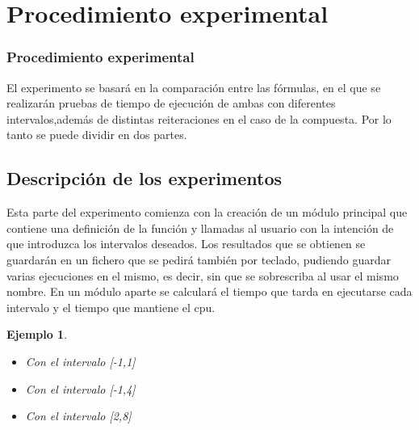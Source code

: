 \documentclass{beamer}
\newtheorem{ejemplo}{Ejemplo}
\begin{document}
\section{Procedimiento experimental}

\begin{frame}
\frametitle{Procedimiento experimental}
\begin{block}{}
El experimento se basará en la comparación entre las fórmulas, en el que se realizarán pruebas de tiempo de ejecución de ambas con 
diferentes intervalos,además de distintas reiteraciones en el caso de la compuesta.
Por lo tanto se puede dividir en dos partes.

\end{block}
\end{frame}

\subsection{Descripción de los experimentos}

\begin{frame}
Esta parte del experimento comienza con la creación de un módulo principal que contiene una definición de la función y llamadas al usuario
con la intención de que introduzca los intervalos deseados. Los resultados que se obtienen se guardarán en un fichero que se pedirá también por teclado, 
pudiendo guardar varias ejecuciones en el mismo, es decir, sin que se sobrescriba al usar el mismo nombre.
En un módulo aparte se calculará el tiempo que tarda en ejecutarse cada intervalo y el tiempo que mantiene el cpu.

\begin{ejemplo}
  \begin{itemize}
 \item Con el intervalo [-1,1]
    \item Con el intervalo [-1,4]
    \item Con el intervalo [2,8]
  \end{itemize}
\end{ejemplo}

\end{frame}

\begin{frame}
\begin{block}{}

\end{block}
\end{frame}
\end{document}
